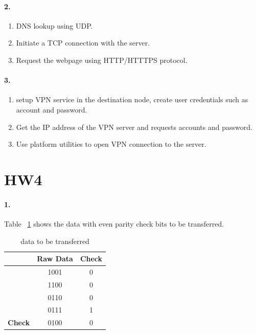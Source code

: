 \documentclass{article}
\begin{document}
\paragraph{2.}

\begin{enumerate}
    \item DNS lookup using UDP.
    \item Initiate a TCP connection with the server.
    \item Request the webpage using HTTP/HTTTPS protocol.
\end{enumerate}

\paragraph{3.}

\begin{enumerate}
    \item setup VPN service in the destination node, create user credentials such as account and password.
    \item Get the IP address of the VPN server and requests accounts and password.
    \item Use platform utilities to open VPN connection to the server.
\end{enumerate}

\section{HW4}

\paragraph{1.} Table ~\ref{tab:transferred} shows the data with even parity check bits to be transferred.

\begin{table}[h!]
    \begin{center}
      \caption{data to be transferred}
      \label{tab:transferred}
      \begin{tabular}{c|c|c} %
        \toprule
        & \textbf{Raw Data} & \textbf{Check}\\
        \hline
        &1001&0\\
        \hline
        &1100&0\\
        \hline
        &0110&0\\
        \hline
        &0111&1\\
        \hline
        \textbf{Check}&0100&0\\
        \bottomrule
      \end{tabular}
    \end{center}
  \end{table}
\end{document}
